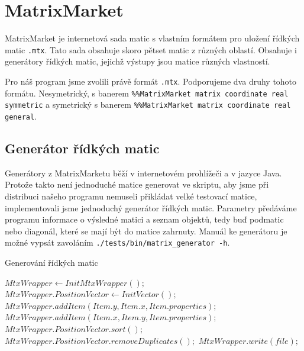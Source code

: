 
\section{MatrixMarket}
\label{MM}

MatrixMarket \cite{Boisvert:1997:MMW:265834.265854} je internetová sada matic s vlastním formátem pro uložení řídkých matic \texttt{.mtx}. Tato sada obsahuje skoro pětset matic z různých oblastí. Obsahuje i generátory řídkých matic, jejichž výstupy jsou matice různých vlastností.

Pro náš program jsme zvolili právě formát \texttt{.mtx}. Podporujeme dva druhy tohoto formátu. Nesymetrický, s banerem \texttt{\%\%MatrixMarket matrix coordinate real symmetric} a symetrický s banerem \texttt{\%\%MatrixMarket matrix coordinate real general}.

\subsection{Generátor řídkých matic}

Generátory z MatrixMarketu běží v internetovém prohlížeči a v jazyce Java. Protože takto není jednoduché matice generovat ve skriptu, aby jsme při distribuci našeho programu nemuseli přikládat velké testovací matice, implementovali jsme jednoduchý generátor řídkých matic. Parametry předáváme programu informace o výsledné matici a seznam objektů, tedy buď podmatic nebo diagonál, které se mají být do matice zahrnuty. Manuál ke generátoru je možné vypsát zavoláním \texttt{./tests/bin/matrix\_generator -h}.    

\begin{algorithm}[H]
	\caption{Generování řídkých matic}\label{mmm-recursive}
	\begin{algorithmic}[1]
		\State \texttt{$MtxWrapper \gets InitMtxWrapper();$}
		\State \texttt{$MtxWrapper.PositionVector \gets InitVector();$}	
			\State \texttt{$MtxWrapper.addItem(Item.y, Item.x, Item.properties);$}
				\State \texttt{$MtxWrapper.addItem(Item.x, Item.y, Item.properties);$}
			\EndIf
		\EndFor
		\State \texttt{$MtxWrapper.PositionVector.sort();$}
		\State \texttt{$MtxWrapper.PositionVector.removeDuplicates();$}
		\State \texttt{$MtxWrapper.write(file);$}
		\EndProcedure
	\end{algorithmic}
\end{algorithm}

